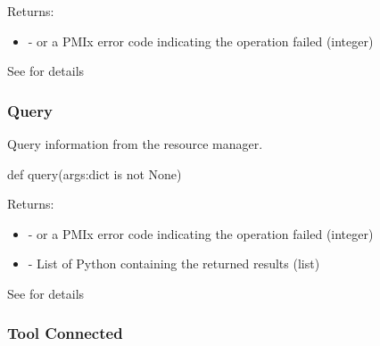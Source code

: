 Returns:
\begin{itemize}
    \item {} -  or a \ac{PMIx} error code indicating the operation failed (integer)
\end{itemize}

See  for details


\subsubsection{Query}

\summary

Query information from the resource manager.

\format

\pyspecificstart
\begin{codepar}
def query(args:dict is not None)
\end{codepar}
\pyspecificend

\begin{arglist}
\end{arglist}

Returns:
\begin{itemize}
    \item {} -  or a \ac{PMIx} error code indicating the operation failed (integer)
    \item {} - List of Python  containing the returned results (list)
\end{itemize}

See  for details


\subsubsection{Tool Connected}


